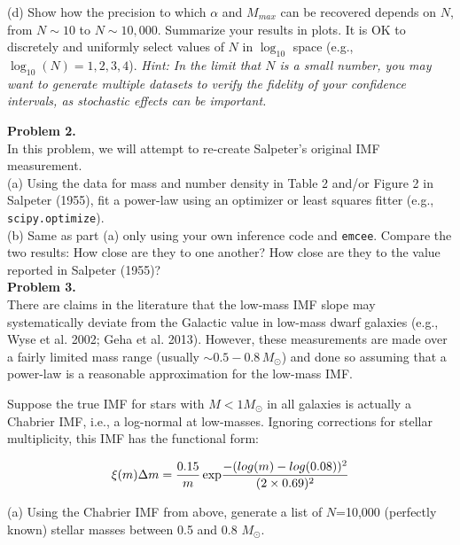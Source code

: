 \documentclass{article}
\begin{document}
(d) Show how the precision to which $\alpha$ and $M_{max}$ can be recovered depends on $N$, from $N \sim 10$ to $N\sim10,000$. Summarize your results in plots.  It is OK to discretely and uniformly select values of $N$ in $\log_{10}$ space (e.g., $\log_{10}(N) = 1,2,3,4$). \textit{Hint: In the limit that $N$ is a small number, you may want to generate multiple datasets to verify the fidelity of your confidence intervals, as stochastic effects can be important.}   \\

\newpage

\noindent \textbf{Problem 2.} \\ 

In this problem, we will attempt to re-create Salpeter's original IMF measurement.  \\

(a) Using the data for mass and number density in Table 2 and/or Figure 2 in Salpeter (1955), fit a power-law using an optimizer or least squares fitter (e.g., \texttt{scipy.optimize}).\\

(b) Same as part (a) only using your own inference code and \texttt{emcee}.  Compare the two results:  How close are they to one another? How close are they to the value reported in Salpeter (1955)?  \\

\noindent \textbf{Problem 3.} \\ 

There are claims in the literature that the low-mass IMF slope may systematically deviate from the Galactic value in low-mass dwarf galaxies (e.g., Wyse et al. 2002; Geha et al. 2013).  However, these measurements are made over a fairly limited mass range (usually $\sim 0.5- 0.8 \, M_{\odot}$) and done so assuming that a power-law is a reasonable approximation for the low-mass IMF.

Suppose the true IMF for stars with $M<1 M_{\odot}$ in all galaxies is actually a Chabrier IMF, i.e., a log-normal at low-masses.  Ignoring corrections for stellar multiplicity, this IMF has the functional form:

\begin{equation}
\xi(m)\Delta m = \frac{0.15}{m} \, {\rm exp}\frac{-(log(m) - log(0.08))^2}{(2\times0.69)^2}
\end{equation}


(a) Using the Chabrier IMF from above, generate a list of $N$=10,000 (perfectly known) stellar masses between 0.5 and 0.8 $M_{\odot}$.  \\
\end{document}
